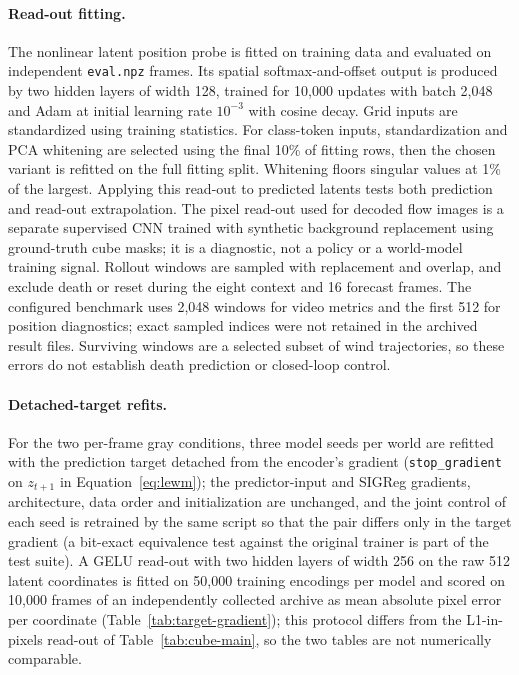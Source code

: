 \paragraph{Read-out fitting.}
The nonlinear latent position probe is fitted on training data and evaluated on independent
\texttt{eval.npz} frames. Its spatial softmax-and-offset output is produced by two hidden layers of width 128, trained for
10,000 updates with batch 2,048 and Adam at initial learning rate $10^{-3}$ with cosine decay.
Grid inputs are standardized using training statistics. For class-token inputs, standardization and
PCA whitening are selected using the final 10\% of fitting rows, then the chosen variant is refitted
on the full fitting split. Whitening floors singular values at 1\% of the largest.
Applying this read-out
to predicted latents tests both prediction and read-out extrapolation. The pixel read-out used for
decoded flow images is a separate supervised CNN trained with synthetic background replacement
using ground-truth cube masks; it is a diagnostic, not a policy or a world-model training signal.
Rollout windows are sampled with replacement and overlap, and exclude death or reset during the
eight context and 16 forecast frames. The configured benchmark uses 2,048 windows for video metrics
and the first 512 for position diagnostics; exact sampled indices were not retained in the archived
result files. Surviving windows are a selected subset of wind trajectories, so these errors do not
establish death prediction or closed-loop control.

\paragraph{Detached-target refits.}
For the two per-frame gray conditions, three model seeds per world are refitted with the
prediction target detached from the encoder's gradient (\texttt{stop\_gradient} on $z_{t+1}$ in
Equation~\ref{eq:lewm}); the predictor-input and SIGReg gradients, architecture, data order and
initialization are unchanged, and the joint control of each seed is retrained by the same script so
that the pair differs only in the target gradient (a bit-exact equivalence test against the original
trainer is part of the test suite). A GELU read-out with two hidden layers of width 256 on the
raw 512 latent coordinates is fitted on 50,000 training encodings per model and scored on 10,000
frames of an independently collected archive as mean absolute pixel error per coordinate
(Table~\ref{tab:target-gradient}); this protocol differs from the L1-in-pixels read-out of
Table~\ref{tab:cube-main}, so the two tables are not numerically comparable.

